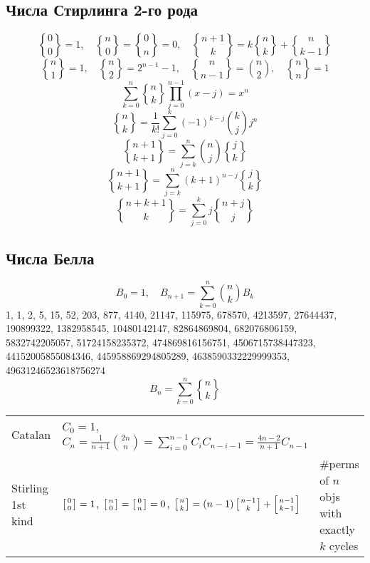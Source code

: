 \documentclass[11.5pt,a4paper,landscape,oneside]{amsart}
\newcommand{\Sequence}[1]{\subsection{#1}}
\newcommand{\stirlingii}{\genfrac{\{}{\}}{0pt}{}}
\begin{document}
\begin{multicols*}{2}
\begin{equation}
	\end{equation}
	\Sequence{Числа Стирлинга 2-го рода}
	\begin{equation}
		\stirlingii{0}{0} = 1,\quad\stirlingii{n}{0}=\stirlingii{0}{n}=0,\quad\stirlingii{n+1}{k} = k \stirlingii{n}{k} + \stirlingii{n}{k-1}
	\end{equation}
	\begin{equation}
		\stirlingii{n}{1} = 1,\quad\stirlingii{n}{2} = 2^{n-1}-1,\quad\stirlingii{n}{n-1}=\binom{n}{2},\quad\stirlingii{n}{n}=1
	\end{equation}
	\begin{equation}
		\sum_{k=0}^n \stirlingii{n}{k}\prod_{j=0}^{n-1}(x-j)=x^n
	\end{equation}
	\begin{equation}
		\stirlingii{n}{k}=\frac{1}{k!}\sum_{j=0}^k (-1)^{k-j}\binom{k}{j}j^n
	\end{equation}
	\begin{equation}
		\stirlingii{n+1}{k+1} = \sum_{j=k}^n \binom{n}{j} \stirlingii{j}{k}
	\end{equation}
	\begin{equation}
		\stirlingii{n+1}{k+1} = \sum_{j=k}^n (k+1)^{n-j} \stirlingii{j}{k}
	\end{equation}
	\begin{equation}
		\stirlingii{n+k+1}{k} = \sum_{j=0}^k j \stirlingii{n+j}{j}
	\end{equation}
	\Sequence{Числа Белла}
	\begin{equation}
		B_0=1,\quad B_{n+1}=\sum_{k=0}^{n} \binom{n}{k} B_k
	\end{equation}
	1, 1, 2, 5, 15, 52, 203, 877, 4140, 21147, 115975, 678570, 4213597, 27644437, 190899322, 1382958545, 10480142147, 82864869804, 682076806159,  5832742205057, 51724158235372, 474869816156751, 4506715738447323, 44152005855084346, 445958869294805289, 4638590332229999353, 49631246523618756274
	\begin{equation}
		B_n=\sum_{k=0}^n \stirlingii{n}{k}
	\end{equation}
		\clearpage
		\begin{tabular}{@{}l|l|l@{}}
    \toprule
    Catalan	&	$C_0=1$, $C_n=\frac{1}{n+1}\binom{2n}{n} = \sum_{i=0}^{n-1}C_iC_{n-i-1} = \frac{4n-2}{n+1}C_{n-1}$  & \\
    Stirling 1st kind & $\left[{0\atop 0}\right]=1$, $\left[{n\atop 0}\right]=\left[{0\atop n}\right]=0$, $\left[{n\atop k}\right]=(n-1)\left[{n-1\atop k}\right]+\left[{n-1\atop k-1}\right]$ & \#perms of $n$ objs with exactly $k$ cycles\\

\end{tabular}
\end{multicols*}
\end{document}
